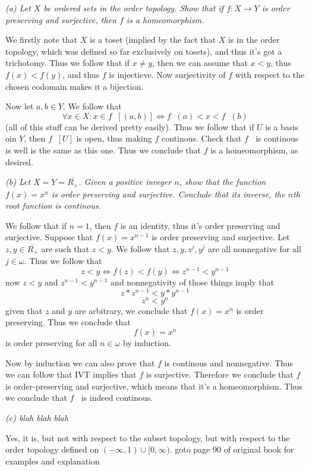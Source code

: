 \documentclass[11pt,oneside,titlepage]{book}
\DeclareMathOperator \inv {^{-1}}
\DeclareMathOperator \lra {\Leftrightarrow}
\begin{document}
\textit{(a) Let $X$ be ordered sets in the order topology. Show that if $f: X \to Y$
  is order preserving and surjective, then $f$ is a homeomorphism.}

We firstly note that $X$ is a toset (implied by the fact that $X$ is in the order topology,
which was defined so far exclusively on tosets), and thus it's got a trichotomy.
Thus we follow that if $x \neq y$, then we can assume that $x < y$, thus
$f(x) < f(y)$, and thus $f$ is injectieve. Now surjectivity of $f$ with respect to the
chosen codomain makes it a bijection.

Now let $a, b \in Y$. We follow that
$$\forall x \in X: x \in f\inv[(a, b)] \lra f\inv(a) < x < f\inv(b)$$
(all of this stuff can be derived pretty easily). Thus we follow that
if $U$ is a basis oin $Y$, then $f\inv[U]$ is open, thus making $f$ continous. Check that
$f \inv$ is continous is well is the same as this one. Thus we conclude that
$f$ is a homeomorphism, as desired.

\textit{(b)  Let $X = Y = \overline{R_+}$. Given a positive inveger $n$, show that the function
  $f(x) = x^n$ is order preserving and surjective. Conclude that its inverse, the $n$th root
  function is continous.}

We follow that if $n = 1$, then $f$ is an identity, thus it's order preserving and surjective.
Suppose that $f(x) = x^{n - 1}$ is order preserving and surjective. Let $z, y \in \overline{R_+}$
are such that $z < y$. We follow that $z, y, z^j, y^j$ are all nonnegative for all $j \in \omega$.
Thus we follow that 
$$z < y \iff f(z) < f(y) \iff z^{n - 1} < y^{n - 1} $$
now $z < y$ and $z^{n - 1} < y^{n - 1}$ and nonnegativity of those things imply that
$$z * z^{n - 1} < y * y^{n - 1}$$
$$z^{n} < y^{n}$$
given that $z$ and $y$ are arbitrary, we conclude that $f(x) = x^n$ is order preserving.
Thus we conclude that
$$f(x) = x^n$$
is order preserving for all $n \in \omega$ by induction.

Now by induction we can also prove that $f$ is continous and nonnegative. Thus we
can follow that IVT implies that $f$ is surjective. Therefore we conclude that
$f$ is order-preserving and surjective, which means that it's a homeomorphism.
Thus we conclude that $f\inv$ is indeed continous.

\textit{(c) blah blah blah}

Yes, it is, but not with respect to the subset topology, but with respect to the order topology
defined on $(-\infty, 1) \cup [0, \infty)$. goto page 90 of original book for
examples and explanation
\end{document}
